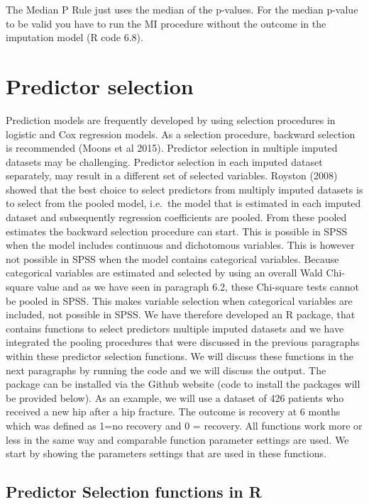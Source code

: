 \documentclass[]{book}
\begin{document}
The Median P Rule just uses the median of the p-values. For the median
p-value to be valid you have to run the MI procedure without the outcome
in the imputation model (R code 6.8).

\section{Predictor selection}\label{predictor-selection}

Prediction models are frequently developed by using selection procedures
in logistic and Cox regression models. As a selection procedure,
backward selection is recommended (Moons et al 2015). Predictor
selection in multiple imputed datasets may be challenging. Predictor
selection in each imputed dataset separately, may result in a different
set of selected variables. Royston (2008) showed that the best choice to
select predictors from multiply imputed datasets is to select from the
pooled model, i.e.~the model that is estimated in each imputed dataset
and subsequently regression coefficients are pooled. From these pooled
estimates the backward selection procedure can start. This is possible
in SPSS when the model includes continuous and dichotomous variables.
This is however not possible in SPSS when the model contains categorical
variables. Because categorical variables are estimated and selected by
using an overall Wald Chi-square value and as we have seen in paragraph
6.2, these Chi-square tests cannot be pooled in SPSS. This makes
variable selection when categorical variables are included, not possible
in SPSS. We have therefore developed an R package, that contains
functions to select predictors multiple imputed datasets and we have
integrated the pooling procedures that were discussed in the previous
paragraphs within these predictor selection functions. We will discuss
these functions in the next paragraphs by running the code and we will
discuss the output. The package can be installed via the Github website
(code to install the packages will be provided below). As an example, we
will use a dataset of 426 patients who received a new hip after a hip
fracture. The outcome is recovery at 6 months which was defined as 1=no
recovery and 0 = recovery. All functions work more or less in the same
way and comparable function parameter settings are used. We start by
showing the parameters settings that are used in these functions.

\subsection{Predictor Selection functions in
R}\label{predictor-selection-functions-in-r}
\end{document}
